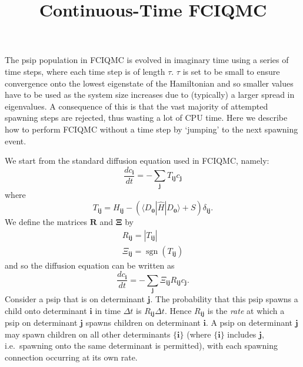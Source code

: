 \documentclass[a4paper, 11pt]{article}
\newcommand{\bi}{\mathbf{i}}
\newcommand{\bj}{\mathbf{j}}
\newcommand{\bz}{\mathbf{0}}
\newcommand{\bra}{\langle}
\newcommand{\ket}{\rangle}
\newcommand{\dd}[2]{\frac{d#1}{d#2}}
\newcommand{\Hamil}{\hat{H}}
\newcommand{\sgn}{\operatorname{sgn}}
\begin{document}
\title{Continuous-Time FCIQMC}

\maketitle

The psip population in FCIQMC is evolved in imaginary time using a series of time steps, where each time step is of length $\tau$.  $\tau$ is set to be small to ensure convergence onto the lowest eigenstate of the Hamiltonian and so smaller values have to be used as the system size increases due to (typically) a larger spread in eigenvalues.  A consequence of this is that the vast majority of attempted spawning steps are rejected, thus wasting a lot of CPU time.  Here we describe how to perform FCIQMC without a time step by `jumping' to the next spawning event.

We start from the standard diffusion equation used in FCIQMC, namely:
\begin{equation}
\dd{c_\bi}{t} = - \sum_\bj T_{\bi\bj} c_\bj
\end{equation}
where
\begin{equation}
T_{\bi\bj} = H_{\bi\bj} - (\bra D_\bz | \Hamil | D_\bz \ket + S)\delta_{\bi\bj}.
\end{equation}
We define the matrices $\mathbf{R}$ and $\boldsymbol{\Xi}$ by
\begin{gather}
R_{\bi\bj} = |T_{\bi\bj}| \\
\Xi_{\bi\bj} = \sgn(T_{\bi\bj})
\end{gather}
and so the diffusion equation can be written as
\begin{equation}
\dd{c_\bi}{t} = - \sum_\bj \Xi_{\bi\bj} R_{\bi\bj} c_\bj.
\end{equation}
Consider a psip that is on determinant $\bj$.  The probability that this psip spawns a child onto determinant $\bi$ in time $\Delta t$ is $R_{\bi\bj}\Delta t$.  Hence $R_{\bi\bj}$ is the \emph{rate} at which a psip on determinant $\bj$ spawns children on determinant $\bi$.  A psip on determinant $\bj$ may spawn children on all other determinants $\{\bi\}$ (where $\{\bi\}$ includes $\bj$, i.e.\ spawning onto the same determinant is permitted), with each spawning connection occurring at its own rate.
\end{document}
